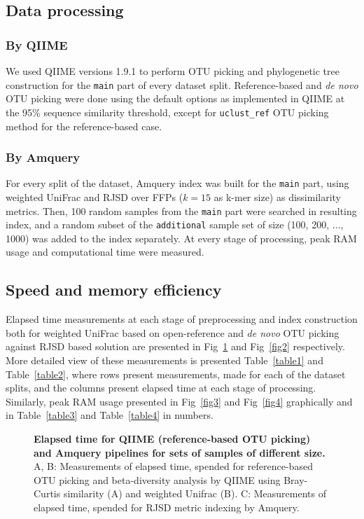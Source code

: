 \documentclass[10pt,letterpaper]{article}
\begin{document}
\subsection*{Data processing}

\subsubsection*{By QIIME}
We used QIIME versions 1.9.1 to perform OTU picking and phylogenetic tree construction for the \texttt{main} part of every dataset split.
Reference-based and \textit{de novo} OTU picking were done using the default options as implemented in QIIME at the 95\% sequence similarity threshold, 
except for \texttt{uclust\_ref} OTU picking method for the reference-based case.

\subsubsection*{By Amquery}
For every split of the dataset, Amquery index was built for the \texttt{main} part, using weighted UniFrac and RJSD over FFPs ($k=15$ as k-mer size) as dissimilarity metrics.
Then, 100 random samples from the \texttt{main} part were searched in resulting index, and a random subset of the \texttt{additional} sample set of size (100, 200, $\dots$, 1000) was added to the index separately. 
At every stage of processing, peak RAM usage and computational time were measured.

\subsection*{Speed and memory efficiency}
Elapsed time measurements at each stage of preprocessing and index construction 
both for weighted UniFrac based on open-reference and \textit{de novo} OTU picking against RJSD based solution 
are presented in Fig~\ref{fig1} and Fig~\ref{fig2} respectively.
More detailed view of these measurements is presented Table~\ref{table1} and Table~\ref{table2},
where rows present measurements, made for each of the dataset splits, and the columns present elapsed time at each stage of processing. 
Similarly, peak RAM usage presented in Fig~\ref{fig3} and Fig~\ref{fig4} graphically and in Table~\ref{table3} and Table~\ref{table4} in numbers.


\begin{figure}[!h]
\caption{{\bf Elapsed time for QIIME (reference-based OTU picking) and Amquery pipelines for sets of samples of different size.}
A, B: Measurements of elapsed time, spended for reference-based OTU picking and beta-diversity analysis by QIIME using Bray-Curtis similarity (A) and weighted Unifrac (B). 
C: Measurements of elapsed time, spended for RJSD metric indexing by Amquery.}
\label{fig1}
\end{figure}
\end{document}
